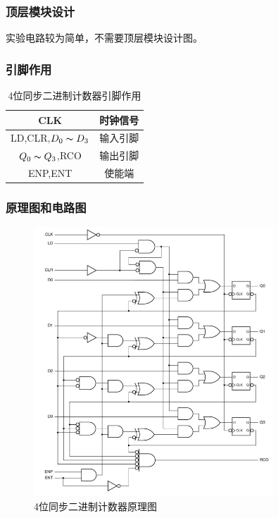 \documentclass{article}
\begin{document}
    \subsubsection{顶层模块设计}
    实验电路较为简单，不需要顶层模块设计图。

    \subsubsection{引脚作用}
    \begin{table}[H]
    \centering
    \begin{tabular}{|c|c|}
        \hline
        CLK  & 时钟信号 \\ \hline
        LD,CLR,$D_{0}\thicksim D_{3}$ & 输入引脚 \\ \hline
        $Q_{0}\thicksim Q_{3}$,RCO   & 输出引脚 \\ \hline
        ENP,ENT   & 使能端 \\ \hline
    \end{tabular}
    \caption{4位同步二进制计数器引脚作用}
    \end{table}

    \subsubsection{原理图和电路图}
    \begin{figure}[H]
    \centering
    \includegraphics[width=0.8\textwidth]{1.4.1.png}
    \caption{4位同步二进制计数器原理图}
    \end{figure}
\end{document}
